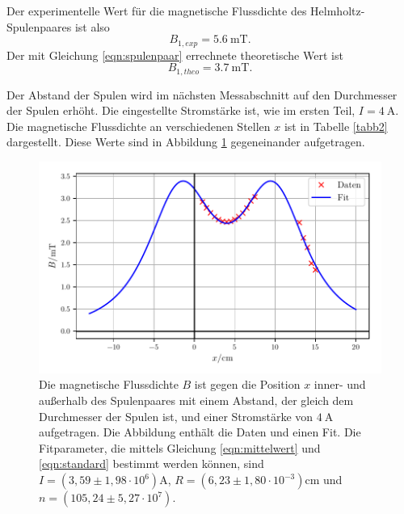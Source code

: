 \noindent Der experimentelle Wert für die magnetische Flussdichte
des Helmholtz-Spulenpaares ist also
\begin{equation*}
   B_{1,exp} = \SI{5.6}{\milli\tesla}.
\end{equation*}
Der mit Gleichung \eqref{eqn:spulenpaar} errechnete theoretische
Wert ist 
\begin{equation*}
   B_{1,theo} = \SI{3.7}{\milli\tesla}.
\end{equation*}

\noindent Der Abstand der Spulen wird im nächsten Messabschnitt auf den
Durchmesser der Spulen erhöht.
Die eingestellte Stromstärke ist, wie im ersten Teil,
$I = \SI{4}{\ampere}$.
Die magnetische Flussdichte an verschiedenen Stellen $x$ ist
in Tabelle \ref{tabb2} dargestellt.
Diese Werte sind in Abbildung \ref{plotb2} gegeneinander %
aufgetragen.


\begin{figure}
    \centering
    \includegraphics{build/plotb2.pdf}
    \caption{Die magnetische Flussdichte $B$ ist gegen die Position $x$ inner-
    und außerhalb des Spulenpaares mit einem Abstand, der gleich dem Durchmesser
    der Spulen ist, und einer Stromstärke von $\SI{4}{\ampere}$ aufgetragen.
    Die Abbildung enthält die Daten und einen Fit.
    Die Fitparameter, die mittels Gleichung \eqref{eqn:mittelwert} und \eqref{eqn:standard}
    bestimmt werden können, sind $I = (3,59 \pm 1,98 \cdot 10^6) \si{\ampere}$, 
    $R = (6,23 \pm 1,80 \cdot 10^{-3}) \si{\centi\meter}$ und $n = (105,24 \pm 5,27 \cdot 10^7)$. }
    \label{plotb2}
\end{figure}

